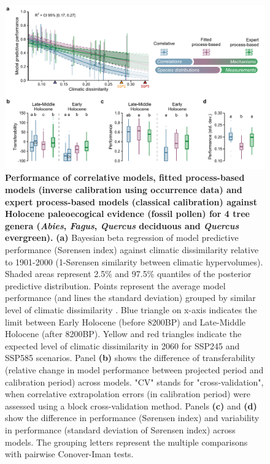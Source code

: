 \documentclass[pdflatex, sn-nature]{sn-jnl}%
\begin{document}
\begin{itemize}
\begin{figure}[ht]
\centering
\hspace*{-0.8in}
\includegraphics[scale=0.9]{past_performance-1.pdf}
\caption{\textbf{Performance of correlative models, fitted process-based models (inverse calibration using occurrence data) and expert process-based models (classical calibration) against Holocene paleoecogical evidence (fossil pollen) for 4 tree genera (\emph{Abies}, \emph{Fagus}, \emph{Quercus} deciduous and \emph{Quercus} evergreen).} \textbf{(a)} Bayesian beta regression of model predictive performance (Sørensen index) against climatic dissimilarity relative to 1901-2000 (1-Sørensen similarity between climatic hypervolumes). Shaded areas represent 2.5\% and 97.5\% quantiles of the posterior predictive distribution. Points represent the average model performance (and lines the standard deviation) grouped by similar level of climatic dissimilarity . Blue triangle on x-axis indicates the limit between Early Holocene (before 8200BP) and Late-Middle Holocene (after 8200BP). Yellow and red triangles indicate the expected level of climatic dissimilarity in 2060 for SSP245 and SSP585 scenarios. Panel \textbf{(b)} shows the difference of transferability (relative change in model performance between projected period and calibration period) across models. "CV" stands for "cross-validation", when correlative extrapolation errors (in calibration period) were assessed using a block cross-validation method. Panels \textbf{(c)} and \textbf{(d)} show the difference in performance (Sørensen index) and variability in performance (standard deviation of Sørensen index) across models. The grouping letters represent the multiple comparisons with pairwise Conover-Iman tests. }\label{past_performance}
\end{figure}


\end{itemize}
\end{document}
